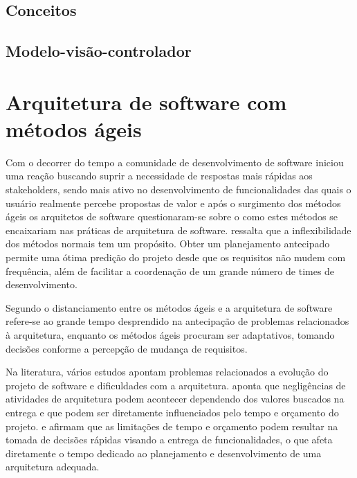\subsection{Conceitos }


\subsection{Modelo-visão-controlador}


\section{Arquitetura de software com métodos ágeis}


Com o decorrer do tempo a comunidade de desenvolvimento de software iniciou uma reação buscando suprir a necessidade de respostas mais rápidas aos stakeholders, sendo mais ativo no desenvolvimento de funcionalidades das quais o usuário realmente percebe propostas de valor e após o surgimento dos métodos ágeis os arquitetos de software questionaram-se sobre o como estes métodos se encaixariam nas práticas de arquitetura de software. \cite{babar2013agile} ressalta que a inflexibilidade dos métodos normais tem um propósito. Obter um planejamento antecipado permite uma ótima predição do projeto desde que os requisitos não mudem com frequência, além de facilitar a coordenação de um grande número de times de desenvolvimento.


Segundo \cite{abrahamsson2010agility} o distanciamento entre os métodos ágeis e a arquitetura de software refere-se ao grande tempo desprendido na antecipação de problemas relacionados à arquitetura, enquanto os métodos ágeis procuram ser adaptativos, tomando decisões conforme a percepção de mudança de requisitos. 

Na literatura, vários estudos apontam problemas relacionados a evolução do projeto de software e dificuldades com a arquitetura. \cite{waterman2015much} aponta que negligências de atividades de arquitetura podem acontecer dependendo dos valores buscados na entrega e que podem ser diretamente influenciados pelo tempo e orçamento do projeto. \cite{martini2015investigating} e \cite{bellomo2013study} afirmam que as limitações de tempo e orçamento podem resultar na tomada de decisões rápidas visando a entrega de funcionalidades, o que afeta diretamente o tempo dedicado ao planejamento e desenvolvimento de uma arquitetura adequada.

